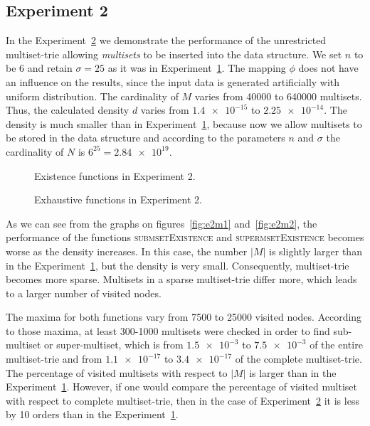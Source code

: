\subsection{Experiment 2} \label{s:exp2}
In the Experiment~\hyperref[s:exp2]{2} we demonstrate the performance of 
the unrestricted multiset-trie allowing \emph{multisets} to be inserted into the data structure. 
We set $n$ to be 6 and retain $\sigma = 25$ as it was in Experiment~\hyperref[s:exp1]{1}. 
The mapping $\phi$ does not have an influence on the results, since the input 
data is generated artificially with uniform distribution. The cardinality of $M$ 
varies from 40000 to 640000 multisets. Thus, the calculated density $d$ varies 
from $\num{1.4e-15}$ to $\num{2.25e-14}.$ The density is much smaller than 
in Experiment~\hyperref[s:exp1]{1}, because now we allow multisets to be stored 
in the data structure and according to the parameters $n$ and $\sigma$ the 
cardinality of $N$ is $6^{25} = \num{2.84e19}.$

\begin{figure}[ht]
\center

\caption{Existence functions in Experiment 2.}
\end{figure}

\begin{figure}[ht]
\center
{}
\caption{Exhaustive functions in Experiment 2.}
\end{figure}

As we can see from the graphs on figures~\ref{fig:e2m1} and~\ref{fig:e2m2}, 
the performance of the functions \textsc{submsetExistence} and 
\textsc{supermsetExistence} becomes worse as the density increases. 
In this case, the number $|M|$ is slightly larger than in the 
Experiment~\hyperref[s:exp1]{1}, but the density is very small. Consequently, 
multiset-trie becomes more sparse. Multisets in a sparse multiset-trie differ more, 
which leads to a larger number of visited nodes. 

The maxima for both functions vary from 7500 to 25000 visited nodes. According 
to those maxima, at least 300-1000 multisets were checked in order to find 
sub-multiset or super-multiset, which is from $\num{1.5e-3}$ to $\num{7.5e-3}$ of the entire 
multiset-trie and from $\num{1.1e-17}$ to $\num{3.4e-17}$ of the complete 
multiset-trie. The percentage of visited multisets with respect to $|M|$ is 
larger than in the Experiment~\hyperref[s:exp1]{1}. However, if one would compare 
the percentage of visited multiset with respect to complete multiset-trie, then 
in the case of Experiment~\hyperref[s:exp2]{2} it is less by 10 orders than in the 
Experiment~\hyperref[s:exp1]{1}.

